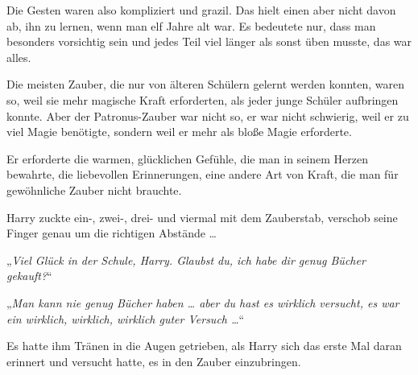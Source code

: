 Die Gesten waren also kompliziert und grazil. Das hielt einen aber nicht davon ab, ihn zu lernen, wenn man elf Jahre alt war. Es bedeutete nur, dass man besonders vorsichtig sein und jedes Teil viel länger als sonst üben musste, das war alles.

Die meisten Zauber, die nur von älteren Schülern gelernt werden konnten, waren so, weil sie mehr magische Kraft erforderten, als jeder junge Schüler aufbringen konnte. Aber der Patronus-Zauber war nicht so, er war nicht schwierig, weil er zu viel Magie benötigte, sondern weil er mehr als bloße Magie erforderte.

Er erforderte die warmen, glücklichen Gefühle, die man in seinem Herzen bewahrte, die liebevollen Erinnerungen, eine andere Art von Kraft, die man für gewöhnliche Zauber nicht brauchte.

Harry zuckte ein-, zwei-, drei- und viermal mit dem Zauberstab, verschob seine Finger genau um die richtigen Abstände …

„\emph{Viel Glück in der Schule, Harry. Glaubst du, ich habe dir genug Bücher gekauft?}“

„\emph{Man kann nie genug Bücher haben … aber du hast es wirklich versucht, es war ein wirklich, wirklich, wirklich guter Versuch …}“

Es hatte ihm Tränen in die Augen getrieben, als Harry sich das erste Mal daran erinnert und versucht hatte, es in den Zauber einzubringen.

